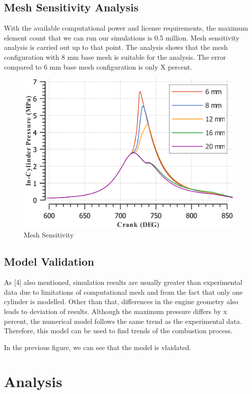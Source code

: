 \documentclass[conference]{IEEEtran}
\begin{document}
\subsection{Mesh Sensitivity Analysis}
With the available computational power and license requirements, the maximum element count that we can run our simulations is 0.5 million. Mesh sensitivity analysis is carried out up to that point. The analysis shows that the mesh configuration with 8 mm base mesh is suitable for the analysis. The error compared to 6 mm base mesh configuration is only X percent.
\begin{figure}[htbp]
    \centerline{\includegraphics{Plots/mesh_sens.png}}
    \caption{Mesh Sensitivity}
    \label{plt_t}
    \end{figure}
\subsection{Model Validation}
As [4] also mentioned, simulation results are usually greater than experimental data due to limitations of computational mesh and from the fact that only one cylinder is modelled. Other than that, differences in the engine geometry also leads to deviation of results.
Although the maximum pressure differs by x percent, the numerical model follows the same trend as the experimental data. Therefore, this model can be used to find trends of the combustion process.

In the previous figure, we can see that the model is vlaidated.
    
\section{Analysis}
\end{document}
